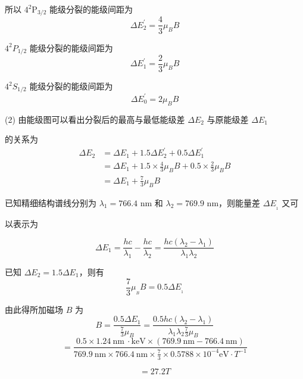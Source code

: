 \documentclass{article}
\begin{document}
\begin{CJK*}{UTF8}{gbsn}
所以 \( 4^2\mathrm{P}_{3/2} \) 能级分裂的能级间距为
\[ \Delta E_{2}^{\prime} = \frac{4}{3}\mu_{B}B \]

\( 4^2P_{1/2} \) 能级分裂的能级间距为
\[ \Delta E_{1}^{\prime} = \frac{2}{3}\mu_{B}B \]

\( 4^{2}S_{1/2} \) 能级分裂的能级间距为
\[ \Delta E_{0}^{\prime} = 2\mu_{B}B \]

(2) 由能级图可以看出分裂后的最高与最低能级差 \( \Delta E_2 \) 与原能级差 \( \Delta E_1 \)

的关系为
\[ 
\begin{aligned}
\Delta E_{2} &= \Delta E_{1} + 1.5\Delta E_{2}^{\prime} + 0.5\Delta E_{1}^{\prime} \\
&= \Delta E_{1} + 1.5\times\frac{4}{3}\mu_{B}B + 0.5\times\frac{2}{3}\mu_{B}B \\
&= \Delta E_{1} + \frac{7}{3}\mu_{B}B
\end{aligned}
\]

已知精细结构谱线分别为 \( \lambda_{1} = 766.4 \) nm 和 \( \lambda_{2} = 769.9 \) nm，则能量差 \( \Delta E_{_1} \) 又可

以表示为

\[ \Delta E_{1} = \frac{hc}{\lambda_{1}} - \frac{hc}{\lambda_{2}} = \frac{hc(\lambda_{2}-\lambda_{1})}{\lambda_{1}\lambda_{2}} \]

已知 \( \Delta E_{2} = 1.5\Delta E_{1} \)，则有
\[ \frac{7}{3}\mu_{_B}B = 0.5\Delta E_{_1} \]

由此得所加磁场 \( B \) 为
\[ B = \frac{0.5\Delta E_{1}}{\frac{7}{3}\mu_{B}} = \frac{0.5hc\left(\lambda_{2}-\lambda_{1}\right)}{\lambda_{1}\lambda_{2}\frac{7}{3}\mu_{B}} \]
\[ = \frac{0.5\times1.24\mathrm{~nm~}\cdot\mathrm{keV}\times\left(769.9\mathrm{~nm-766.4~nm}\right)}{769.9\mathrm{~nm}\times766.4\mathrm{~nm}\times\frac{7}{3}\times0.5788\times10^{-4}\mathrm{eV}\cdot T^{-1}} \]

\[  = 27.2T \]


\end{CJK*}
\end{document}
